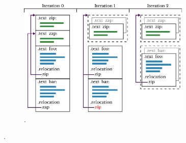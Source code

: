 \begin{figure}[h]





\begin{subfigure}{\textwidth}
\centering
\includegraphics[width=0.9\textwidth]{src/relatedwork/figs/icf-example}
\caption{.}
\label{fig:identical-example}
\end{subfigure}


\end{figure}
